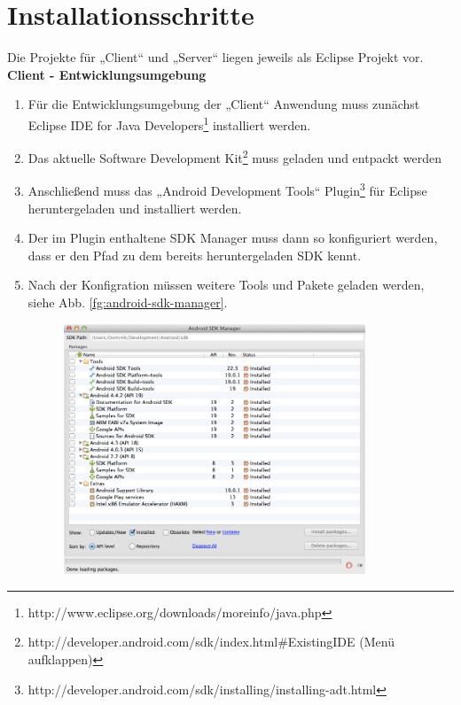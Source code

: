 
\section{Installationsschritte}

Die Projekte für „Client“ und „Server“ liegen jeweils als Eclipse Projekt vor.\\

\textbf{Client - Entwicklungsumgebung}

\begin{enumerate}
	\item Für die Entwicklungsumgebung der „Client“ Anwendung muss zunächst Eclipse IDE for Java Developers\footnote{http://www.eclipse.org/downloads/moreinfo/java.php} installiert werden.
	\item Das aktuelle Software Development Kit\footnote{http://developer.android.com/sdk/index.html\#ExistingIDE (Menü aufklappen)} muss geladen und entpackt werden
	\item Anschließend muss das „Android Development Tools“ Plugin\footnote{http://developer.android.com/sdk/installing/installing-adt.html} für Eclipse heruntergeladen und installiert werden.
	\item Der im Plugin enthaltene SDK Manager muss dann so konfiguriert werden, dass er den Pfad zu dem bereits heruntergeladen SDK kennt.
	\item Nach der Konfigration müssen weitere Tools und Pakete geladen werden, siehe Abb. \ref{fg:android-sdk-manager}.
	\begin{figure}[H]
		\centering
		\includegraphics[width=0.85\textwidth]{./images/install/android-sdk-manager.png}

\end{figure}
\end{enumerate}
